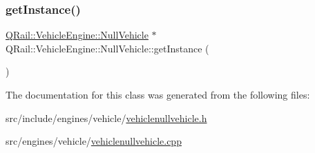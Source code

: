 \subsubsection{\texorpdfstring{getInstance()}{getInstance()}}
{\footnotesize\ttfamily \mbox{\hyperlink{classQRail_1_1VehicleEngine_1_1NullVehicle}{Q\+Rail\+::\+Vehicle\+Engine\+::\+Null\+Vehicle}} $\ast$ Q\+Rail\+::\+Vehicle\+Engine\+::\+Null\+Vehicle\+::get\+Instance (\begin{DoxyParamCaption}{ }\end{DoxyParamCaption})\hspace{0.3cm}{\ttfamily [static]}}



The documentation for this class was generated from the following files\+:\begin{DoxyCompactItemize}
\item 
src/include/engines/vehicle/\mbox{\hyperlink{vehiclenullvehicle_8h}{vehiclenullvehicle.\+h}}\item 
src/engines/vehicle/\mbox{\hyperlink{vehiclenullvehicle_8cpp}{vehiclenullvehicle.\+cpp}}\end{DoxyCompactItemize}
